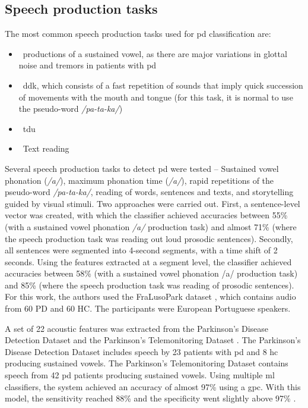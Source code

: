 \subsection{Speech production tasks}

The most common speech production tasks used for \gls{pd} classification are:
\\
\begin{itemize}
	\item ~productions of a sustained vowel, as there are major variations in glottal noise and tremors in patients with \gls{pd} \cite{idiopathic_parkinson}
	\item ~\gls{ddk}, which consists of a fast repetition of sounds that imply quick succession of movements with the mouth and tongue (for this task, it is normal to use the pseudo-word \textit{/pa-ta-ka/})
	\item ~\gls{tdu}
	\item ~Text reading
\end{itemize}

Several speech production tasks to detect \gls{pd} were tested \cite{parkinson_acoustic_pompilli} -- Sustained vowel phonation (\textit{/a/}), maximum phonation time (\textit{/a/}), rapid repetitions of the pseudo-word \textit{/pa-ta-ka/}, reading of words, sentences and texts, and storytelling guided by visual stimuli. Two approaches were carried out. First, a sentence-level vector was created, with which the classifier achieved accuracies between 55\% (with a sustained vowel phonation \textit{/a/} production task) and almost 71\% (where the speech production task was reading out loud prosodic sentences). Secondly, all sentences were segmented into 4-second segments, with a time shift of 2 seconds. Using the features extracted at a segment level, the classifier achieved accuracies between 58\% (with a sustained vowel phonation /a/ production task) and 85\% (where the speech production task was reading of prosodic sentences). For this work, the authors used the FraLusoPark dataset \cite{fralusopark}, which contains audio from 60 PD and 60 HC. The participants were European Portuguese speakers.

A set of 22 acoustic features was extracted from the Parkinson’s Disease Detection Dataset \cite{PDDD} and the Parkinson’s Telemonitoring Dataset \cite{PTD}. The Parkinson’s Disease Detection Dataset includes speech by 23 patients with \gls{pd} and 8 \gls{hc} producing sustained vowels. The Parkinson’s Telemonitoring Dataset contains speech from 42 \gls{pd} patients producing sustained vowels. Using multiple \gls{ml} classifiers, the system achieved an accuracy of almost 97\% using a \gls{gpc}. With this model, the sensitivity reached 88\% and the specificity went slightly above 97\% \cite{parkinson_acoustic_despotovic}.


